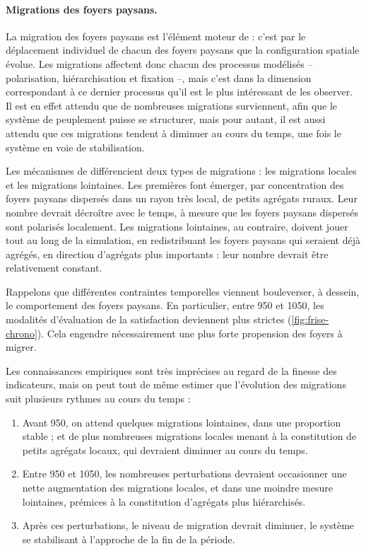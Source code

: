\paragraph{Migrations des foyers paysans.}

La migration des foyers paysans est l'élément moteur de \simfeodal{} :
c'est par le déplacement individuel de chacun des foyers paysans que la configuration spatiale évolue.
Les migrations affectent donc chacun des processus modélisés -- polarisation, hiérarchisation et fixation --, mais c'est dans la dimension correspondant à ce dernier processus qu'il est le plus intéressant de les observer.
Il est en effet attendu que de nombreuses migrations surviennent, afin que le système de peuplement puisse se structurer, mais pour autant, il est aussi attendu que ces migrations tendent à diminuer au cours du temps, une fois le système en voie de stabilisation.

Les mécanismes de \simfeodal{} différencient deux types de migrations : les migrations locales et les migrations lointaines.
Les premières font émerger, par concentration des foyers paysans dispersés dans un rayon très local, de petits agrégats ruraux.
Leur nombre devrait décroître avec le temps, à mesure que les foyers paysans dispersés sont polarisés localement.
Les migrations lointaines, au contraire, doivent jouer tout au long de la simulation, en redistribuant les foyers paysans qui seraient déjà agrégés, en direction d'agrégats plus importants : leur nombre devrait être relativement constant.

Rappelons que différentes contraintes temporelles viennent bouleverser, à dessein, le comportement des foyers paysans.
En particulier, entre 950 et 1050, les modalités d'évaluation de la satisfaction deviennent plus strictes (\cref{fig:frise-chrono}).
Cela engendre nécessairement une plus forte propension des foyers à migrer.

Les connaissances empiriques sont très imprécises au regard de la finesse des indicateurs, mais on peut tout de même estimer que l'évolution des migrations suit plusieurs rythmes au cours du temps :
\begin{enumerate}
\item Avant 950, on attend quelques migrations lointaines, dans une proportion stable ; et de plus nombreuses migrations locales menant à la constitution de petits agrégats locaux, qui devraient diminuer au cours du temps.
\item Entre 950 et 1050, les nombreuses perturbations devraient occasionner une nette augmentation des migrations locales, et dans une moindre mesure lointaines, prémices à la constitution d'agrégats plus hiérarchisés.
\item Après ces perturbations, le niveau de migration devrait diminuer, le système se stabilisant à l'approche de la fin de la période.
\end{enumerate}

